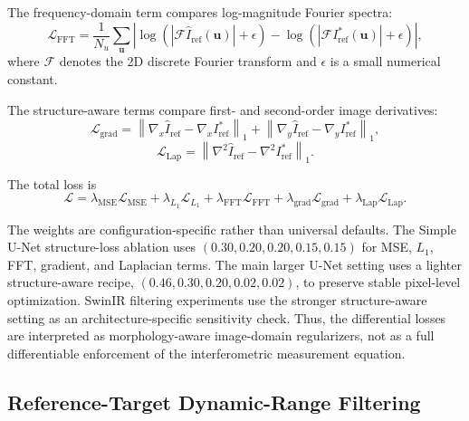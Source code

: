 \documentclass[twocolumn]{aastex631}
\begin{document}
The frequency-domain term compares log-magnitude Fourier spectra:
\begin{equation}
	\mathcal{L}_{\mathrm{FFT}} =
	\frac{1}{N_u}\sum_{\mathbf{u}}
	\left|
	\log\left(|\mathcal{F}\hat{I}_{\mathrm{ref}}(\mathbf{u})|+\epsilon\right)
	-
	\log\left(|\mathcal{F}I_{\mathrm{ref}}^*(\mathbf{u})|+\epsilon\right)
	\right|,
\end{equation}
where $\mathcal{F}$ denotes the 2D discrete Fourier transform and $\epsilon$ is a small numerical constant.

The structure-aware terms compare first- and second-order image derivatives:
\begin{equation}
	\mathcal{L}_{\mathrm{grad}} =
	\left\| \nabla_x \hat{I}_{\mathrm{ref}} - \nabla_x I_{\mathrm{ref}}^* \right\|_1
	+
	\left\| \nabla_y \hat{I}_{\mathrm{ref}} - \nabla_y I_{\mathrm{ref}}^* \right\|_1,
\end{equation}
\begin{equation}
	\mathcal{L}_{\mathrm{Lap}} =
	\left\| \nabla^2 \hat{I}_{\mathrm{ref}} - \nabla^2 I_{\mathrm{ref}}^* \right\|_1.
\end{equation}

The total loss is
\begin{equation}
	\mathcal{L} =
	\lambda_{\mathrm{MSE}}\mathcal{L}_{\mathrm{MSE}}
	+\lambda_{L_1}\mathcal{L}_{L_1}
	+\lambda_{\mathrm{FFT}}\mathcal{L}_{\mathrm{FFT}}
	+\lambda_{\mathrm{grad}}\mathcal{L}_{\mathrm{grad}}
	+\lambda_{\mathrm{Lap}}\mathcal{L}_{\mathrm{Lap}}.
	\label{eq:total_loss}
\end{equation}

The weights are configuration-specific rather than universal defaults.
The Simple U-Net structure-loss ablation uses $(0.30,0.20,0.20,0.15,0.15)$ for MSE, $L_1$, FFT, gradient, and Laplacian terms.
The main larger U-Net setting uses a lighter structure-aware recipe, $(0.46,0.30,0.20,0.02,0.02)$, to preserve stable pixel-level optimization.
SwinIR filtering experiments use the stronger structure-aware setting as an architecture-specific sensitivity check.
Thus, the differential losses are interpreted as morphology-aware image-domain regularizers, not as a full differentiable enforcement of the interferometric measurement equation.

\subsection{Reference-Target Dynamic-Range Filtering}
\label{sec:filtering}
\end{document}
